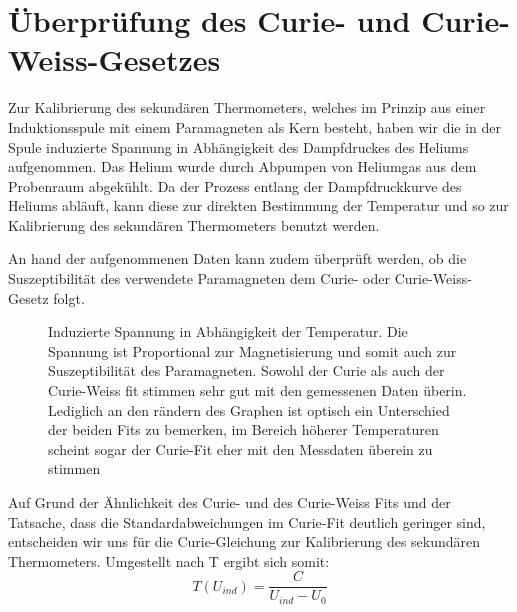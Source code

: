 \documentclass[bigchapter,colorback,accentcolor=tud4b,linedtoc,11pt]{tudreport}
\begin{document}
\section{Überprüfung des Curie- und Curie-Weiss-Gesetzes}
Zur Kalibrierung des sekundären Thermometers, welches im Prinzip aus einer
Induktionsspule mit einem Paramagneten als Kern besteht, haben wir die in der
Spule induzierte Spannung in Abhängigkeit des Dampfdruckes des Heliums
aufgenommen. Das Helium wurde durch Abpumpen von Heliumgas aus dem Probenraum
abgekühlt. Da der Prozess entlang der Dampfdruckkurve des Heliums abläuft, kann
diese zur direkten Bestimmung der Temperatur und so zur Kalibrierung des
sekundären Thermometers benutzt werden.

An hand der aufgenommenen Daten kann zudem überprüft werden, ob die Suszeptibilität
des verwendete Paramagneten dem Curie- oder Curie-Weiss-Gesetz folgt.
\begin{figure}[H]
    \caption{Induzierte Spannung in Abhängigkeit der Temperatur. Die Spannung
        ist Proportional zur Magnetisierung und somit auch zur Suszeptibilität des
        Paramagneten. Sowohl der Curie als auch der Curie-Weiss fit stimmen sehr gut
        mit den gemessenen Daten überin. Lediglich an den rändern des Graphen ist
        optisch ein Unterschied der beiden Fits zu bemerken, im Bereich höherer
        Temperaturen scheint sogar der Curie-Fit eher mit den Messdaten überein zu stimmen}
\end{figure}

Auf Grund der Ähnlichkeit des Curie- und des Curie-Weiss Fits und der Tatsache,
dass die Standardabweichungen im Curie-Fit deutlich geringer sind, entscheiden wir
uns für die Curie-Gleichung zur Kalibrierung des sekundären
Thermometers. Umgestellt nach T ergibt sich somit:
$$T(U_{ind}) = \frac{C}{U_{ind}-U_0}$$ 
\end{document}
